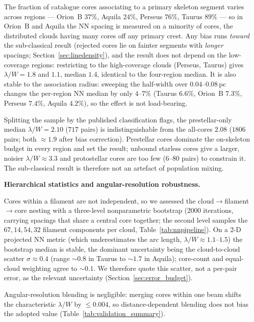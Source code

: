 \documentclass[usenatbib,twoside,twocolumn]{mnras}
\begin{document}
The fraction of catalogue cores associating to a primary skeleton segment varies across regions --- Orion~B $37\%$, Aquila $24\%$, Perseus $76\%$, Taurus $89\%$ --- so in Orion~B and Aquila the NN spacing is measured on a minority of cores, the distributed clouds having many cores off any primary crest. Any bias runs \emph{toward} the sub-classical result (rejected cores lie on fainter segments with \emph{longer} spacings; Section~\ref{sec:linedensity}), and the result does not depend on the low-coverage regions: restricting to the high-coverage clouds (Perseus, Taurus) gives $\lambda/W=1.8$ and $1.1$, median $1.4$, identical to the four-region median. It is also stable to the association radius: sweeping the half-width over $0.04$--$0.08$\,pc changes the per-region NN median by only $4$--$7\%$ (Taurus $6.6\%$, Orion~B $7.3\%$, Perseus $7.4\%$, Aquila $4.2\%$), so the effect is not load-bearing.

Splitting the sample by the published classification flags, the prestellar-only median $\lambda/W=2.10$ ($717$ pairs) is indistinguishable from the all-cores $2.08$ ($1806$ pairs; both $\approx1.9$ after bias correction). Prestellar cores dominate the on-skeleton budget in every region and set the result; unbound starless cores give a larger, noisier $\lambda/W\approx3.3$ and protostellar cores are too few ($6$--$80$ pairs) to constrain it. The sub-classical result is therefore not an artefact of population mixing.

\smallskip\noindent\textbf{Hierarchical statistics and angular-resolution robustness.}

Cores within a filament are not independent, so we assessed the cloud$\to$filament$\to$core nesting with a three-level nonparametric bootstrap (2000 iterations, carrying spacings that share a central core together; the second level samples the $67,14,54,32$ filament components per cloud, Table~\ref{tab:nnpipeline}). On a 2-D projected NN metric (which underestimates the arc length, $\lambda/W\approx1.1$--$1.5$) the bootstrap median is stable, the dominant uncertainty being the cloud-to-cloud scatter $\sigma\approx0.4$ (range $\sim0.8$ in Taurus to $\sim1.7$ in Aquila); core-count and equal-cloud weighting agree to $\sim0.1$. We therefore quote this scatter, not a per-pair error, as the relevant uncertainty (Section~\ref{sec:error_budget}).

Angular-resolution blending is negligible: merging cores within one beam shifts the characteristic $\lambda/W$ by $\le0.004$, so distance-dependent blending does not bias the adopted value (Table~\ref{tab:validation_summary}).
\end{document}
